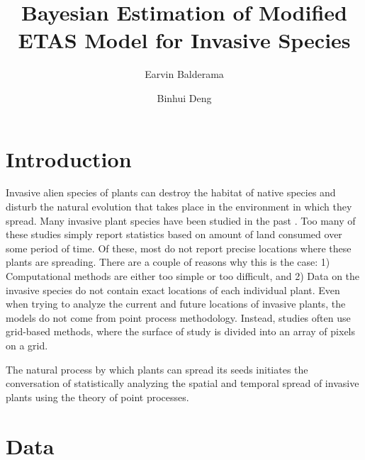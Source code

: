 \documentclass[11pt]{article}\usepackage[]{graphicx}\usepackage[]{color}
\begin{document}





\title{\bf Bayesian Estimation of Modified ETAS Model for Invasive Species}
\author{Earvin Balderama \and Binhui Deng}
\maketitle




\section{Introduction}

Invasive alien species of plants can destroy the habitat of native species and disturb the natural evolution that takes place in the environment in which they spread. Many invasive plant species have been studied in the past \citep{Higgins96,Delisle03}. Too many of these studies simply report statistics based on amount of land consumed over some period of time. Of these, most do not report precise locations where these plants are spreading. There are a couple of reasons why this is the case: 1) Computational methods are either too simple or too difficult, and 2) Data on the invasive species do not contain exact locations of each individual plant. Even when trying to analyze the current and future locations of invasive plants, the models do not come from point process methodology. Instead, studies often use grid-based methods, where the surface of study is divided into an array of pixels on a grid.

The natural process by which plants can spread its seeds initiates the conversation of statistically analyzing the spatial and temporal spread of invasive plants using the theory of point processes.


\section{Data}
\end{document}
